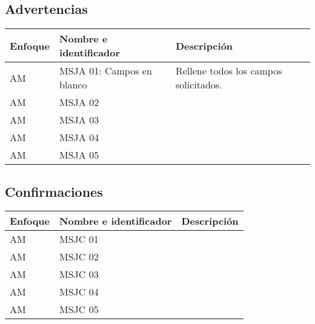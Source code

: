 \subsection{Advertencias}
  \begin{center}
   \begin{tabular}{|p{1.5cm}|p{4cm}|p{7cm}|}
     \hline
       \textbf{Enfoque}&\textbf{Nombre e identificador} & \textbf{Descripción} \\ \hline
       	\label{msja_01} AM & MSJA 01: Campos en blanco & Rellene todos los campos solicitados.\\ \hline
       	\label{msja_} AM & MSJA 02 & \\ \hline
       	\label{msja_} AM & MSJA 03 & \\ \hline
       	\label{msja_} AM & MSJA 04 & \\ \hline
       	\label{msja_} AM & MSJA 05 & \\ \hline
   \end{tabular}
    \label{tab:msja}
 \end{center}  
 
\subsection{Confirmaciones}
  \begin{center}
   \begin{tabular}{|p{1.5cm}|p{4cm}|p{7cm}|}
     \hline
       \textbf{Enfoque}&\textbf{Nombre e identificador} & \textbf{Descripción} \\ \hline
       \label{msjc_} AM & MSJC 01 & \\ \hline
       \label{msjc_} AM & MSJC 02 & \\ \hline
       \label{msjc_} AM & MSJC 03 & \\ \hline
       \label{msjc_} AM & MSJC 04 & \\ \hline
       \label{msjc_} AM & MSJC 05 & \\ \hline
   \end{tabular}
    \label{tab:msjc}
 \end{center}  
 
